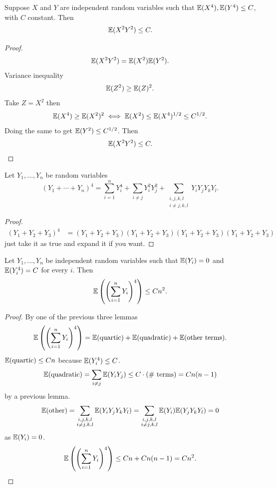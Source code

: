\documentclass[10pt, a4paper]{article}
\begin{document}
\begin{lemma}
    Suppose $X$ and $Y$ are independent random variables such that $\mathbb{E}(X ^ 4), \mathbb{E}(Y ^ 4) \leq C$,
    with $C$ constant.
    Then
    \[
    \mathbb{E}(X ^ 2Y ^ 2) \leq C.
    \]

    \begin{proof}
        \[
        \mathbb{E}(X ^ 2Y ^ 2) = \mathbb{E}(X ^ 2)\mathbb{E}(Y ^ 2).
        \]
        Variance inequality
        \[
        \mathbb{E}(Z ^ 2) \geq \mathbb{E}(Z) ^ 2.
        \]
        Take $Z = X ^ 2$ then
        \[
        \mathbb{E}(X ^ 4) \geq \mathbb{E}(X ^ 2) ^ 2 \iff \mathbb{E}(X ^ 2) \leq \mathbb{E}(X ^ 4) ^ {1 / 2} \leq C ^ {1 / 2}.
        \]
        Doing the same to get $\mathbb{E}(Y ^ 2) \leq C ^ {1 / 2}$.
        Then
        \[
        \mathbb{E}(X ^ 2Y ^ 2) \leq C.
        \]
    \end{proof}
\end{lemma}

\begin{lemma}
    Let $Y_1, \dotsc, Y_n$ be random variables
    \[
    (Y_1 + \dotsi + Y_n) ^ 4 = \sum_{i = 1}^{n}Y_i ^ 4 + \sum_{i \neq j}Y_i ^ 2Y_j ^ 2 + \sum_{\substack{i, j, k, l \\ i \neq j, k, l}}Y_iY_jY_kY_l.
    \]

    \begin{proof}
        \begin{align*}
            (Y_1 + Y_2 + Y_3) ^ 4 &= (Y_1 + Y_2 + Y_3)(Y_1 + Y_2 + Y_3)(Y_1 + Y_2 + Y_3)(Y_1 + Y_2 + Y_3)
        \end{align*}
        just take it as true and expand it if you want.
    \end{proof}
\end{lemma}

\begin{lemma}
    Let $Y_1, \dotsc, Y_n$ be independent random variables such that $\mathbb{E}(Y_i) = 0$ and $\mathbb{E}(Y_i ^ 4) = C$ for every $i$.
    Then
    \[
    \mathbb{E}\left(\left(\sum_{i = 1}^{n}Y_i\right) ^ 4\right) \leq Cn ^ 2.
    \]

    \begin{proof}
        By one of the previous three lemmas
        \[
        \mathbb{E}\left(\left(\sum_{i = 1}^{n}Y_i\right) ^ 4\right) = \mathbb{E}(\text{quartic}) + \mathbb{E}(\text{quadratic}) + \mathbb{E}(\text{other terms}).
        \]
        $\mathbb{E}(\text{quartic}) \leq Cn$ because $\mathbb{E}(Y_i ^ 4) \leq C$.
        \[
        \mathbb{E}(\text{quadratic}) = \sum_{i \neq j}\mathbb{E}(Y_iY_j) \leq C \cdot (\text{\# terms}) = Cn(n - 1)
        \]
        by a previous lemma.
        \[
        \mathbb{E}(\text{other}) = \sum_{\substack{i, j, k, l \\ i \neq j, k, l}}\mathbb{E}(Y_iY_jY_kY_l) = \sum_{\substack{i, j, k, l \\ i \neq j, k, l}}\mathbb{E}(Y_i)\mathbb{E}(Y_jY_kY_l) = 0
        \]
        as $\mathbb{E}(Y_i) = 0$.
        \[
        \mathbb{E}\left(\left(\sum_{i = 1}^{n}Y_i\right) ^ 4\right) \leq Cn + Cn(n - 1) = Cn ^ 2.
        \]
    \end{proof}
\end{lemma}
\end{document}
